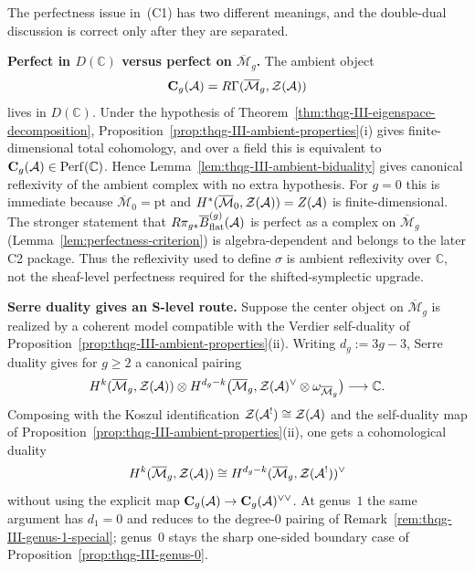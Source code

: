 \begin{remark}
\label{rem:thqg-III-c1-serre-route}
The perfectness issue in~(C1) has two different meanings, and the
double-dual discussion is correct only after they are separated.

\smallskip\noindent
\textbf{Perfect in $D(\mathbb{C})$ versus perfect on
$\overline{\mathcal{M}}_g$.}\;
The ambient object
\[
\mathbf{C}_g(\mathcal{A})=R\Gamma(\overline{\mathcal{M}}_g,\mathcal{Z}(\mathcal{A}))
\]
lives in $D(\mathbb{C})$. Under the hypothesis of
Theorem~\ref{thm:thqg-III-eigenspace-decomposition},
Proposition~\ref{prop:thqg-III-ambient-properties}(i) gives
finite-dimensional total cohomology, and over a field this is
equivalent to $\mathbf{C}_g(\mathcal{A})\in\operatorname{Perf}(\mathbb{C})$. Hence
Lemma~\ref{lem:thqg-III-ambient-biduality} gives canonical
reflexivity of the ambient complex with no extra hypothesis. For
$g=0$ this is immediate because
$\overline{\mathcal{M}}_0=\mathrm{pt}$ and
$H^*(\overline{\mathcal{M}}_0,\mathcal{Z}(\mathcal{A}))=Z(\mathcal{A})$ is
finite-dimensional. The stronger statement that
$R\pi_{g*}\overline{B}^{(g)}_{\mathrm{flat}}(\mathcal{A})$ is perfect as a complex on
$\overline{\mathcal{M}}_g$
\textup{(}Lemma~\textup{\ref{lem:perfectness-criterion}}\textup{)}
is algebra-dependent and belongs to the later C2 package. Thus the
reflexivity used to define $\sigma$ is ambient reflexivity over
$\mathbb{C}$, not the sheaf-level perfectness required for the
shifted-symplectic upgrade.

\smallskip\noindent
\textbf{Serre duality gives an S-level route.}\;
Suppose the center object on $\overline{\mathcal{M}}_g$ is realized by
a coherent model compatible with the Verdier self-duality of
Proposition~\ref{prop:thqg-III-ambient-properties}(ii). Writing
$d_g:=3g-3$, Serre duality gives for $g\geq 2$ a canonical pairing
\begin{equation}\label{eq:thqg-III-serre-c1-pairing}
H^k(\overline{\mathcal{M}}_g,\mathcal{Z}(\mathcal{A}))
\otimes
H^{d_g-k}\bigl(
\overline{\mathcal{M}}_g,\mathcal{Z}(\mathcal{A})^{\vee}\otimes
\omega_{\overline{\mathcal{M}}_g}\bigr)
\longrightarrow
\mathbb{C}.
\end{equation}
Composing with the Koszul identification
$\mathcal{Z}(\mathcal{A}^!)\cong\mathcal{Z}(\mathcal{A})$ and the self-duality map of
Proposition~\ref{prop:thqg-III-ambient-properties}(ii), one gets a
cohomological duality
\[
H^k(\overline{\mathcal{M}}_g,\mathcal{Z}(\mathcal{A}))
\cong
H^{d_g-k}(\overline{\mathcal{M}}_g,\mathcal{Z}(\mathcal{A}^!))^{\vee}
\]
without using the explicit map
$\mathbf{C}_g(\mathcal{A})\to\mathbf{C}_g(\mathcal{A})^{\vee\vee}$.
At genus~$1$ the same argument has $d_1=0$ and reduces to the
degree-$0$ pairing of
Remark~\ref{rem:thqg-III-genus-1-special}; genus~$0$ stays the sharp
one-sided boundary case of
Proposition~\ref{prop:thqg-III-genus-0}.


\end{remark}
